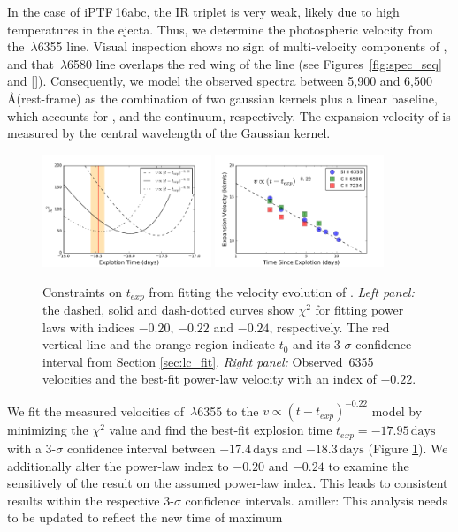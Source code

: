 \documentclass[twocolumn]{aastex61}
\newcommand{\abc}{iPTF\,16abc}
\newcommand{\amiller}[1]{{\color{blue} amiller: {#1}}}
\begin{document}
In the case of \abc, the  IR triplet is very weak, 
likely due to high temperatures in the ejecta. Thus, we
determine the photospheric velocity from the 
\,$\lambda$6355 line. Visual inspection shows no 
sign of multi-velocity components of , and that 
\,$\lambda$6580 line overlaps the red
wing of the  line (see Figures~\ref{fig:spec_seq} and \ref{}). Consequently, we model the observed 
spectra between 5,900 and 6,500\,\AA (rest-frame) as the combination 
of two gaussian kernels plus a linear baseline, which
accounts for ,  and the
continuum, respectively. The expansion
velocity of  is measured by the central wavelength
of the  Gaussian kernel.

\begin{figure}[!thb]
  \centering
  \includegraphics[width=0.45\textwidth]{Chi2.pdf}
  \includegraphics[width=0.45\textwidth]{VelocityPlot.pdf}
  \caption{Constraints on $t_{exp}$ from fitting the velocity
    evolution of .
    \textit{Left panel:} the dashed, solid
    and dash-dotted curves show $\chi^2$ for fitting power laws with
    indices $-0.20$, $-0.22$ and $-0.24$, respectively. The red
    vertical line and the orange region indicate $t_0$ and its
    3-$\sigma$ confidence interval from Section
    \ref{sec:lc_fit}.
    \textit{Right panel:} Observed \,6355
    velocities and the best-fit power-law velocity with an index of
    $-0.22$.}
  \label{fig:velocity_t_exp}
\end{figure}

We fit the measured velocities of \,$\lambda$6355 to the
$v\propto(t-t_{exp})^{-0.22}$ model by minimizing the $\chi^2$ value
and find the best-fit explosion time $t_{exp} = -17.95\,\textrm{days}$
with a 3-$\sigma$ confidence interval between $-17.4\,\textrm{days}$
and $-18.3\,\textrm{days}$ (Figure \ref{fig:velocity_t_exp}). We additionally
alter the power-law index to $-0.20$ and $-0.24$ to examine the
sensitively of the result on the assumed power-law index.  This 
leads to consistent results within the respective 3-$\sigma$ 
confidence intervals. \amiller{This analysis needs to be updated to reflect the new time of maximum}
\end{document}

